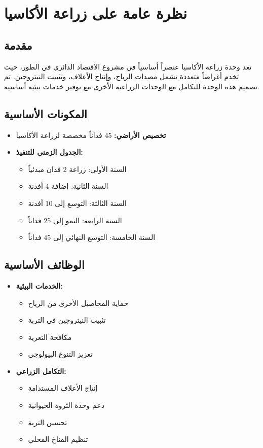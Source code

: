 \section{نظرة عامة على زراعة الأكاسيا}

\subsection{مقدمة}
تعد وحدة زراعة الأكاسيا عنصراً أساسياً في مشروع الاقتصاد الدائري في الطور، حيث تخدم أغراضاً متعددة تشمل مصدات الرياح، وإنتاج الأعلاف، وتثبيت النيتروجين. تم تصميم هذه الوحدة للتكامل مع الوحدات الزراعية الأخرى مع توفير خدمات بيئية أساسية.

\subsection{المكونات الأساسية}
\begin{itemize}
    \item \textbf{تخصيص الأراضي:} 45 فداناً مخصصة لزراعة الأكاسيا
    \item \textbf{الجدول الزمني للتنفيذ:}
    \begin{itemize}
        \item السنة الأولى: زراعة 2 فدان مبدئياً
        \item السنة الثانية: إضافة 4 أفدنة
        \item السنة الثالثة: التوسع إلى 10 أفدنة
        \item السنة الرابعة: النمو إلى 25 فداناً
        \item السنة الخامسة: التوسع النهائي إلى 45 فداناً
    \end{itemize}
\end{itemize}

\subsection{الوظائف الأساسية}
\begin{itemize}
    \item \textbf{الخدمات البيئية:}
    \begin{itemize}
        \item حماية المحاصيل الأخرى من الرياح
        \item تثبيت النيتروجين في التربة
        \item مكافحة التعرية
        \item تعزيز التنوع البيولوجي
    \end{itemize}
    
    \item \textbf{التكامل الزراعي:}
    \begin{itemize}
        \item إنتاج الأعلاف المستدامة
        \item دعم وحدة الثروة الحيوانية
        \item تحسين التربة
        \item تنظيم المناخ المحلي
    \end{itemize}
\end{itemize}

